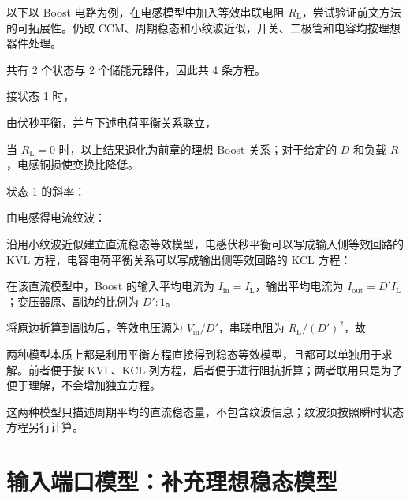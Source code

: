 
以下以 Boost 电路为例，在电感模型中加入等效串联电阻 $R_{\mathrm{L}}$，尝试验证前文方法的可拓展性。仍取 CCM、周期稳态和小纹波近似，开关、二极管和电容均按理想器件处理。



共有 2 个状态与 2 个储能元器件，因此共 4 条方程。


接状态 1 时，


由伏秒平衡，并与下述电荷平衡关系联立，

当 $R_{\mathrm{L}}=0$ 时，以上结果退化为前章的理想 Boost 关系；对于给定的 $D$ 和负载 $R$，电感铜损使变换比降低。



状态 1 的斜率：

由电感得电流纹波：


沿用小纹波近似建立直流稳态等效模型，电感伏秒平衡可以写成输入侧等效回路的 KVL 方程，电容电荷平衡关系可以写成输出侧等效回路的 KCL 方程：

在该直流模型中，Boost 的输入平均电流为 $I_{\mathrm{in}}=I_{\mathrm{L}}$，输出平均电流为 $I_{\mathrm{out}}=D'I_{\mathrm{L}}$；变压器原、副边的比例为 $D':1$。


将原边折算到副边后，等效电压源为 $V_{\mathrm{in}}/D'$，串联电阻为 $R_{\mathrm{L}}/(D')^2$，故


两种模型本质上都是利用平衡方程直接得到稳态等效模型，且都可以单独用于求解。前者便于按 KVL、KCL 列方程，后者便于进行阻抗折算；两者联用只是为了便于理解，不会增加独立方程。

这两种模型只描述周期平均的直流稳态量，不包含纹波信息；纹波须按照瞬时状态方程另行计算。

\section{输入端口模型：补充理想稳态模型}

